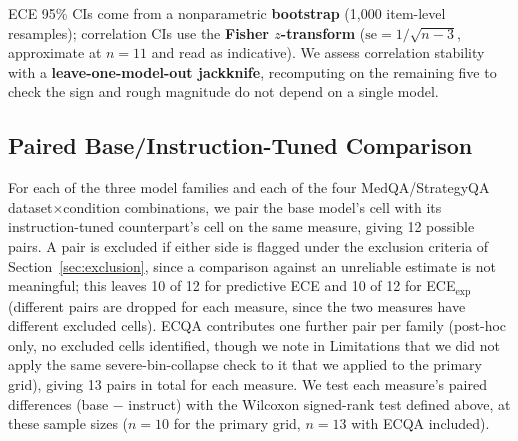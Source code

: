 \documentclass[letterpaper]{article} %
\begin{document}
ECE 95\% CIs come from a nonparametric \textbf{bootstrap} (1{,}000 item-level resamples); correlation CIs use the \textbf{Fisher $z$-transform} ($\text{se}=1/\sqrt{n-3}$, approximate at $n{=}11$ and read as indicative). We assess correlation stability with a \textbf{leave-one-model-out jackknife}, recomputing on the remaining five to check the sign and rough magnitude do not depend on a single model.

\subsection{Paired Base/Instruction-Tuned Comparison} \label{sec:pairing} For each of the three model families and each of the four MedQA/StrategyQA dataset$\times$condition combinations, we pair the base model's cell with its instruction-tuned counterpart's cell on the same measure, giving 12 possible pairs. A pair is excluded if either side is flagged under the exclusion criteria of Section~\ref{sec:exclusion}, since a comparison against an unreliable estimate is not meaningful; this leaves 10 of 12 for predictive ECE and 10 of 12 for ECE$_{\text{exp}}$ (different pairs are dropped for each measure, since the two measures have different excluded cells). ECQA contributes one further pair per family (post-hoc only, no excluded cells identified, though we note in Limitations that we did not apply the same severe-bin-collapse check to it that we applied to the primary grid), giving 13 pairs in total for each measure. We test each measure's paired differences (base $-$ instruct) with the Wilcoxon signed-rank test defined above, at these sample sizes ($n{=}10$ for the primary grid, $n{=}13$ with ECQA included).
\end{document}
